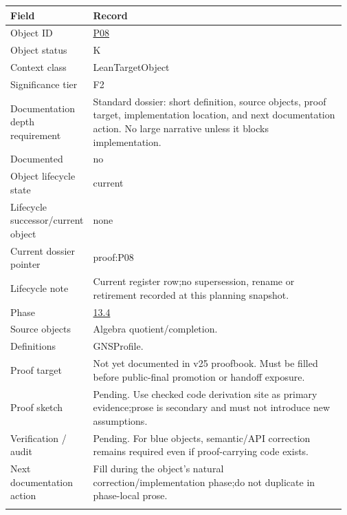 \begin{longtable}{L{0.16\linewidth} L{0.81\linewidth}}
\hline
\textbf{Field} & \textbf{Record}\\
\hline
Object ID & \hyperlink{object-row-P08}{P08}\\
\hline\addlinespace[0.20em]
Object status & K\\
\hline\addlinespace[0.20em]
Context class & LeanTargetObject\\
\hline\addlinespace[0.20em]
Significance tier & F2\\
\hline\addlinespace[0.20em]
Documentation depth requirement & Standard dossier: short definition, source objects, proof target, implementation location, and next documentation action. No large narrative unless it blocks implementation.\\
\hline\addlinespace[0.20em]
Documented & no\\
\hline\addlinespace[0.20em]
Object lifecycle state & current\\
\hline\addlinespace[0.20em]
Lifecycle successor/\allowbreak{}current object & none\\
\hline\addlinespace[0.20em]
Current dossier pointer & proof:P08\\
\hline\addlinespace[0.20em]
Lifecycle note & Current register row;\newline no supersession, rename or retirement recorded at this planning snapshot.\\
\hline\addlinespace[0.20em]
Phase & \hyperlink{phase-row-13-4}{13.4}\\
\hline\addlinespace[0.20em]
Source objects & Algebra quotient/\allowbreak{}completion.\\
\hline\addlinespace[0.20em]
Definitions & GNSProfile.\\
\hline\addlinespace[0.20em]
Proof target & Not yet documented in v25 proofbook. Must be filled before public-final promotion or handoff exposure.\\
\hline\addlinespace[0.20em]
Proof sketch & Pending. Use checked code derivation site as primary evidence;\newline prose is secondary and must not introduce new assumptions.\\
\hline\addlinespace[0.20em]
Verification /\allowbreak{} audit & Pending. For blue objects, semantic/\allowbreak{}API correction remains required even if proof-carrying code exists.\\
\hline\addlinespace[0.20em]
Next documentation action & Fill during the object's natural correction/\allowbreak{}implementation phase;\newline do not duplicate in phase-local prose.\\
\hline\addlinespace[0.20em]
\end{longtable}
